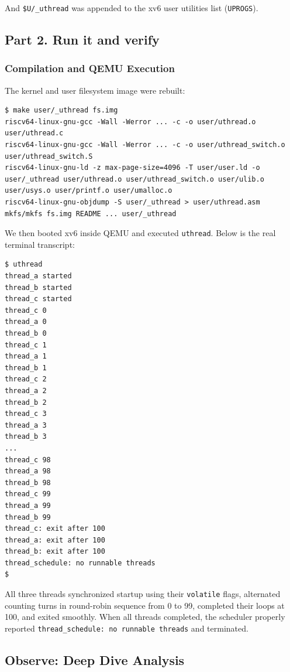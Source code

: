 \documentclass{labreport}
\begin{document}
And \texttt{\$U/\_uthread} was appended to the xv6 user utilities list (\texttt{UPROGS}).

\subsection{Part 2. Run it and verify}

\subsubsection{Compilation and QEMU Execution}
The kernel and user filesystem image were rebuilt:
\begin{lstlisting}[style=bash]
$ make user/_uthread fs.img
riscv64-linux-gnu-gcc -Wall -Werror ... -c -o user/uthread.o user/uthread.c
riscv64-linux-gnu-gcc -Wall -Werror ... -c -o user/uthread_switch.o user/uthread_switch.S
riscv64-linux-gnu-ld -z max-page-size=4096 -T user/user.ld -o user/_uthread user/uthread.o user/uthread_switch.o user/ulib.o user/usys.o user/printf.o user/umalloc.o
riscv64-linux-gnu-objdump -S user/_uthread > user/uthread.asm
mkfs/mkfs fs.img README ... user/_uthread
\end{lstlisting}

We then booted xv6 inside QEMU and executed \texttt{uthread}. Below is the real terminal transcript:

\begin{lstlisting}[style=bash]
$ uthread
thread_a started
thread_b started
thread_c started
thread_c 0
thread_a 0
thread_b 0
thread_c 1
thread_a 1
thread_b 1
thread_c 2
thread_a 2
thread_b 2
thread_c 3
thread_a 3
thread_b 3
...
thread_c 98
thread_a 98
thread_b 98
thread_c 99
thread_a 99
thread_b 99
thread_c: exit after 100
thread_a: exit after 100
thread_b: exit after 100
thread_schedule: no runnable threads
$ 
\end{lstlisting}

All three threads synchronized startup using their \texttt{volatile} flags, alternated counting turns in round-robin sequence from 0 to 99, completed their loops at 100, and exited smoothly. When all threads completed, the scheduler properly reported \texttt{thread\_schedule: no runnable threads} and terminated.

\subsection{Observe: Deep Dive Analysis}
\end{document}
